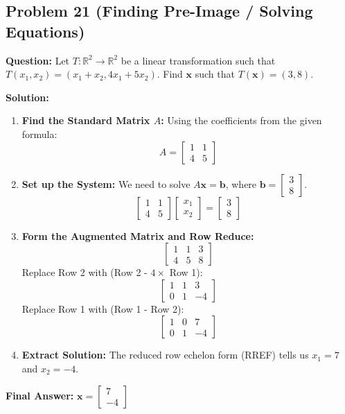 \documentclass[11pt]{article}
\begin{document}
\subsection*{Problem 21 (Finding Pre-Image / Solving Equations)}
\textbf{Question:} Let $T: \mathbb{R}^2 \to \mathbb{R}^2$ be a linear transformation such that $T(x_1, x_2) = (x_1+x_2, 4x_1+5x_2)$. Find $\mathbf{x}$ such that $T(\mathbf{x}) = (3, 8)$.

\textbf{Solution:}
\begin{enumerate}
    \item \textbf{Find the Standard Matrix $A$:} Using the coefficients from the given formula:
    \[ A = \begin{bmatrix} 1 & 1 \\ 4 & 5 \end{bmatrix} \]
    \item \textbf{Set up the System:} We need to solve $A\mathbf{x} = \mathbf{b}$, where $\mathbf{b} = \begin{bmatrix} 3 \\ 8 \end{bmatrix}$.
    \[ \begin{bmatrix} 1 & 1 \\ 4 & 5 \end{bmatrix} \begin{bmatrix} x_1 \\ x_2 \end{bmatrix} = \begin{bmatrix} 3 \\ 8 \end{bmatrix} \]
    \item \textbf{Form the Augmented Matrix and Row Reduce:}
    \[ \left[ \begin{array}{cc|c} 1 & 1 & 3 \\ 4 & 5 & 8 \end{array} \right] \]
    Replace Row 2 with (Row 2 - $4 \times$ Row 1):
    \[ \left[ \begin{array}{cc|c} 1 & 1 & 3 \\ 0 & 1 & -4 \end{array} \right] \]
    Replace Row 1 with (Row 1 - Row 2):
    \[ \left[ \begin{array}{cc|c} 1 & 0 & 7 \\ 0 & 1 & -4 \end{array} \right] \]
    \item \textbf{Extract Solution:} The reduced row echelon form (RREF) tells us $x_1 = 7$ and $x_2 = -4$.
\end{enumerate}
\textbf{Final Answer:} $\mathbf{x} = \begin{bmatrix} 7 \\ -4 \end{bmatrix}$
\end{document}
